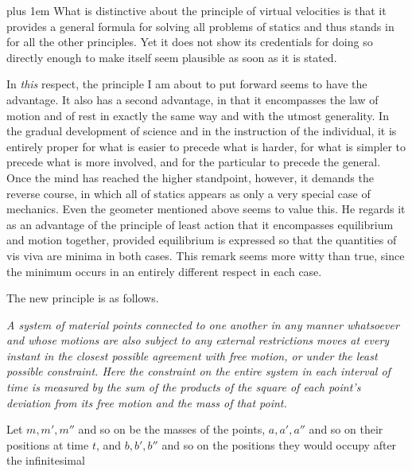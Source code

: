 \par{}
{\rightskip=0pt plus 1em What is distinctive about the principle of virtual velocities is that it provides a general formula for solving all problems of statics and thus stands in for all the other principles. Yet it does not show its credentials for doing so directly enough to make itself seem plausible as soon as it is stated.\par}

In \textit{this} respect, the principle I am about to put forward seems to have the advantage. It also has a second advantage, in that it encompasses the law of motion and of rest in exactly the same way and with the utmost generality. In the gradual development of science and in the instruction of the individual, it is entirely proper for what is easier to precede what is harder, for what is simpler to precede what is more involved, and for the particular to precede the general. Once the mind has reached the higher standpoint, however, it demands the reverse course, in which all of statics appears as only a very special case of mechanics. Even the geometer mentioned above seems to value this. He regards it as an advantage of the principle of least action that it encompasses equilibrium and motion together, provided equilibrium is expressed so that the quantities of vis viva are minima in both cases. This remark seems more witty than true, since the minimum occurs in an entirely different respect in each case.

The new principle is as follows.

\textit{A system of material points connected to one another in any manner whatsoever and whose motions are also subject to any external restrictions moves at every instant in the closest possible agreement with free motion, or under the least possible constraint. Here the constraint on the entire system in each interval of time is measured by the sum of the products of the square of each point’s deviation from its free motion and the mass of that point.}

Let $m,m',m''$ and so on be the masses of the points, $a,a',a''$ and so on their positions at time $t$, and $b,b',b''$ and so on the positions they would occupy after the infinitesimal
